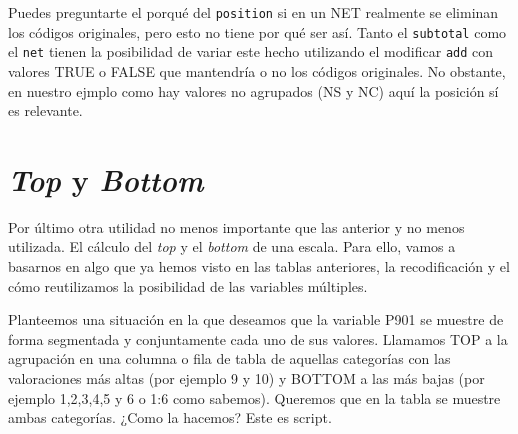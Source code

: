 \documentclass[
]{book}
\begin{document}
Puedes preguntarte el porqué del \texttt{position} si en un NET realmente se eliminan los códigos originales, pero esto no tiene por qué ser así. Tanto el \texttt{subtotal} como el \texttt{net} tienen la posibilidad de variar este hecho utilizando el modificar \texttt{add} con valores TRUE o FALSE que mantendría o no los códigos originales. No obstante, en nuestro ejmplo como hay valores no agrupados (NS y NC) aquí la posición sí es relevante.

\hypertarget{top-y-bottom}{%
\section{\texorpdfstring{\emph{Top} y \emph{Bottom}}{Top y Bottom}}\label{top-y-bottom}}

Por último otra utilidad no menos importante que las anterior y no menos utilizada. El cálculo del \emph{top} y el \emph{bottom} de una escala. Para ello, vamos a basarnos en algo que ya hemos visto en las tablas anteriores, la recodificación y el cómo reutilizamos la posibilidad de las variables múltiples.

Planteemos una situación en la que deseamos que la variable P901 se muestre de forma segmentada y conjuntamente cada uno de sus valores. Llamamos TOP a la agrupación en una columna o fila de tabla de aquellas categorías con las valoraciones más altas (por ejemplo 9 y 10) y BOTTOM a las más bajas (por ejemplo 1,2,3,4,5 y 6 o 1:6 como sabemos). Queremos que en la tabla se muestre ambas categorías. ¿Como la hacemos? Este es script.
\end{document}
